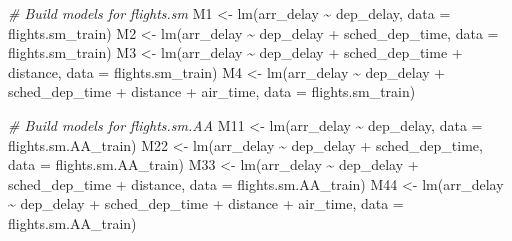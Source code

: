 \documentclass[
]{article}
\newenvironment{Shaded}{\begin{snugshade}}{\end{snugshade}}
\newcommand{\AttributeTok}[1]{\textcolor[rgb]{0.77,0.63,0.00}{#1}}
\newcommand{\CommentTok}[1]{\textcolor[rgb]{0.56,0.35,0.01}{\textit{#1}}}
\newcommand{\FunctionTok}[1]{\textcolor[rgb]{0.00,0.00,0.00}{#1}}
\newcommand{\NormalTok}[1]{#1}
\newcommand{\OtherTok}[1]{\textcolor[rgb]{0.56,0.35,0.01}{#1}}
\newcommand{\SpecialCharTok}[1]{\textcolor[rgb]{0.00,0.00,0.00}{#1}}
\begin{document}
\begin{Shaded}
\begin{Highlighting}[]
\CommentTok{\# Build models for flights.sm}
\NormalTok{M1 }\OtherTok{\textless{}{-}} \FunctionTok{lm}\NormalTok{(arr\_delay }\SpecialCharTok{\textasciitilde{}}\NormalTok{ dep\_delay, }\AttributeTok{data =}\NormalTok{ flights.sm\_train)}
\NormalTok{M2 }\OtherTok{\textless{}{-}} \FunctionTok{lm}\NormalTok{(arr\_delay }\SpecialCharTok{\textasciitilde{}}\NormalTok{ dep\_delay }\SpecialCharTok{+}\NormalTok{ sched\_dep\_time, }\AttributeTok{data =}\NormalTok{ flights.sm\_train)}
\NormalTok{M3 }\OtherTok{\textless{}{-}} \FunctionTok{lm}\NormalTok{(arr\_delay }\SpecialCharTok{\textasciitilde{}}\NormalTok{ dep\_delay }\SpecialCharTok{+}\NormalTok{ sched\_dep\_time }\SpecialCharTok{+}\NormalTok{ distance, }\AttributeTok{data =}\NormalTok{ flights.sm\_train)}
\NormalTok{M4 }\OtherTok{\textless{}{-}} \FunctionTok{lm}\NormalTok{(arr\_delay }\SpecialCharTok{\textasciitilde{}}\NormalTok{ dep\_delay }\SpecialCharTok{+}\NormalTok{ sched\_dep\_time }\SpecialCharTok{+}\NormalTok{ distance }\SpecialCharTok{+}
\NormalTok{    air\_time, }\AttributeTok{data =}\NormalTok{ flights.sm\_train)}
\end{Highlighting}
\end{Shaded}

\begin{Shaded}
\begin{Highlighting}[]
\CommentTok{\# Build models for flights.sm.AA}
\NormalTok{M11 }\OtherTok{\textless{}{-}} \FunctionTok{lm}\NormalTok{(arr\_delay }\SpecialCharTok{\textasciitilde{}}\NormalTok{ dep\_delay, }\AttributeTok{data =}\NormalTok{ flights.sm.AA\_train)}
\NormalTok{M22 }\OtherTok{\textless{}{-}} \FunctionTok{lm}\NormalTok{(arr\_delay }\SpecialCharTok{\textasciitilde{}}\NormalTok{ dep\_delay }\SpecialCharTok{+}\NormalTok{ sched\_dep\_time, }\AttributeTok{data =}\NormalTok{ flights.sm.AA\_train)}
\NormalTok{M33 }\OtherTok{\textless{}{-}} \FunctionTok{lm}\NormalTok{(arr\_delay }\SpecialCharTok{\textasciitilde{}}\NormalTok{ dep\_delay }\SpecialCharTok{+}\NormalTok{ sched\_dep\_time }\SpecialCharTok{+}\NormalTok{ distance,}
    \AttributeTok{data =}\NormalTok{ flights.sm.AA\_train)}
\NormalTok{M44 }\OtherTok{\textless{}{-}} \FunctionTok{lm}\NormalTok{(arr\_delay }\SpecialCharTok{\textasciitilde{}}\NormalTok{ dep\_delay }\SpecialCharTok{+}\NormalTok{ sched\_dep\_time }\SpecialCharTok{+}\NormalTok{ distance }\SpecialCharTok{+}
\NormalTok{    air\_time, }\AttributeTok{data =}\NormalTok{ flights.sm.AA\_train)}
\end{Highlighting}
\end{Shaded}
\end{document}
